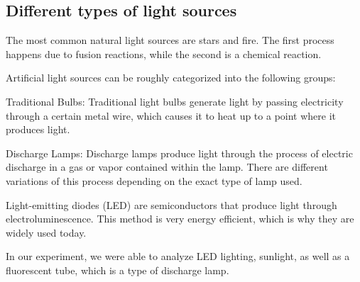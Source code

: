     \subsection{Different types of light sources}

    The most common natural light sources are stars and fire. The first process happens due to fusion reactions, while the
    second is a chemical reaction.

    Artificial light sources can be roughly categorized into the following groups:

    Traditional Bulbs:
        Traditional light bulbs generate light by passing electricity through a certain metal wire, which causes it
        to heat up to a point where it produces light.

    Discharge Lamps:
        Discharge lamps produce light through the process of electric discharge in a gas or vapor 
        contained within the lamp. There are different variations of this process depending on the exact
        type of lamp used.

    Light-emitting diodes (LED) are semiconductors that produce light through electroluminescence.
    This method is very energy efficient, which is why they are widely used today.

    In our experiment, we were able to analyze LED lighting, sunlight, as well as a fluorescent tube, which is a type of discharge lamp.